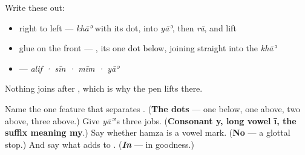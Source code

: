 Write these out:

\begin{itemize}
\raggedright
  \item \textbf{} right to left — \emph{khāʾ} with its dot, into \emph{yāʾ}, then \emph{rā}, and lift
  \item glue \textbf{} on the front — \textbf{}, its one dot below, joining straight into the \emph{khāʾ}
  \item \textbf{} — \emph{alif · sīn · mīm · yāʾ}
\end{itemize}

Nothing joins after \textbf{}, which is why the pen lifts there.

\begin{tcolorbox}[breakable,colback=teal!4,colframe=teal!35!black,title={Before you move on}]
Name the one feature that separates \textbf{   }. (\textbf{The dots} — one below, one above, two above, three above.) Give \emph{yāʾ}'s three jobs. (\textbf{Consonant y, long vowel ī, the suffix meaning my}.) Say whether hamza is a vowel mark. (\textbf{No} — a glottal stop.) And say what \textbf{} adds to \textbf{}. (\emph{\textbf{In}} — in goodness.)
\end{tcolorbox}
